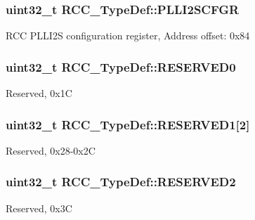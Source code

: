 \subsubsection[{\texorpdfstring{P\+L\+L\+I2\+S\+C\+F\+GR}{PLLI2SCFGR}}]{ uint32\+\_\+t R\+C\+C\+\_\+\+Type\+Def\+::\+P\+L\+L\+I2\+S\+C\+F\+GR}\hypertarget{struct_r_c_c___type_def_ac3beb02dccd9131d6ce55bb29c5fa69f}{}\label{struct_r_c_c___type_def_ac3beb02dccd9131d6ce55bb29c5fa69f}
R\+CC P\+L\+L\+I2S configuration register, Address offset\+: 0x84 
\subsubsection[{\texorpdfstring{R\+E\+S\+E\+R\+V\+E\+D0}{RESERVED0}}]{\setlength{\rightskip}{0pt plus 5cm}uint32\+\_\+t R\+C\+C\+\_\+\+Type\+Def\+::\+R\+E\+S\+E\+R\+V\+E\+D0}\hypertarget{struct_r_c_c___type_def_a646631532167f3386763a2d10a881a04}{}\label{struct_r_c_c___type_def_a646631532167f3386763a2d10a881a04}
Reserved, 0x1C 
\subsubsection[{\texorpdfstring{R\+E\+S\+E\+R\+V\+E\+D1}{RESERVED1}}]{\setlength{\rightskip}{0pt plus 5cm}uint32\+\_\+t R\+C\+C\+\_\+\+Type\+Def\+::\+R\+E\+S\+E\+R\+V\+E\+D1\mbox{[}2\mbox{]}}\hypertarget{struct_r_c_c___type_def_a291f9ae23a96c1bfbab257aad87597a5}{}\label{struct_r_c_c___type_def_a291f9ae23a96c1bfbab257aad87597a5}
Reserved, 0x28-\/0x2C 
\subsubsection[{\texorpdfstring{R\+E\+S\+E\+R\+V\+E\+D2}{RESERVED2}}]{\setlength{\rightskip}{0pt plus 5cm}uint32\+\_\+t R\+C\+C\+\_\+\+Type\+Def\+::\+R\+E\+S\+E\+R\+V\+E\+D2}\hypertarget{struct_r_c_c___type_def_a94cb7e7b923ebacab99c967d0f808235}{}\label{struct_r_c_c___type_def_a94cb7e7b923ebacab99c967d0f808235}
Reserved, 0x3C 
